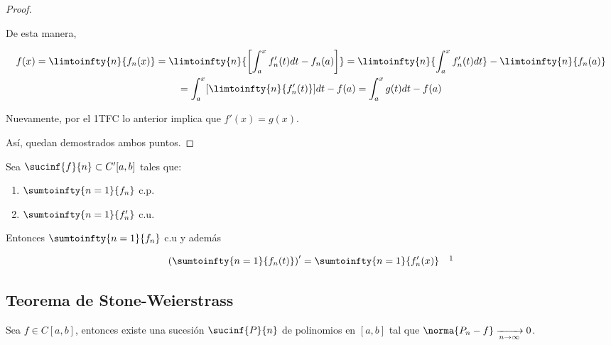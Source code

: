 \begin{proof}
\begin{itemize}
        De esta manera,
        
        \begin{gather*}
            f(x) = \limtoinfty{n}{f_n(x)} = \limtoinfty{n}{\left[ \int_a^x f'_n(t)dt - f_n(a) \right]} = \limtoinfty{n}{\int_a^x f'_n(t)dt} - \limtoinfty{n}{f_n(a)} \\
            = \int_a^x [\limtoinfty{n}{f'_n(t)}]dt - f(a) = \int_a^x g(t)dt - f(a)
        \end{gather*}
        
        Nuevamente, por el 1TFC lo anterior implica que $f'(x) = g(x)$.
    \end{itemize}
    
    Así, quedan demostrados ambos puntos.
\end{proof}

\begin{cor}\label{cor:poderosisimo}
    Sea $\sucinf{f}{n} \subset C'[a,b]$ tales que:
    
    \begin{enumerate}
        \item $\sumtoinfty{n=1}{f_n}$ c.p.
        \item $\sumtoinfty{n=1}{f'_n}$ c.u.
    \end{enumerate}
    
    Entonces $\sumtoinfty{n=1}{f_n}$ c.u y además
    
    \[
    \left( \sumtoinfty{n=1}{f_n(t)} \right)' = \sumtoinfty{n=1}{f'_n(x)} \quad \footnotemark
    \]
\end{cor}

\subsection{Teorema de Stone-Weierstrass}

\begin{teo}
    Sea $f \in C[a,b]$, entonces existe una sucesión $\sucinf{P}{n}$ de polinomios en $[a,b]$ tal que $\norma{P_n - f} \xrightarrow[n \to \infty]{} 0$.
\end{teo}

